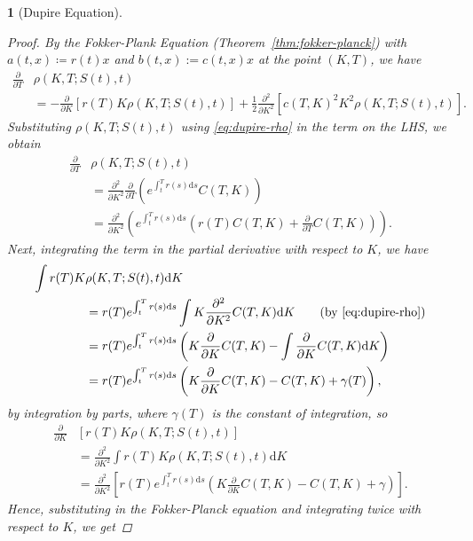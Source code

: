 \documentclass[english]{article}
\numberwithin{equation}{section}
\numberwithin{figure}{section}
\theoremstyle{bolddescit}
\newtheorem{theorem}{\protect\theoremname}[section]
\theoremstyle{definition}
\theoremstyle{definition}
\theoremstyle{plain}
\theoremstyle{plain}
\theoremstyle{bolddesc}
\theoremstyle{plain}
\theoremstyle{remark}
\providecommand{\theoremname}{Theorem}
\begin{document}
\begin{theorem}[Dupire Equation]
\begin{proof}
    By the Fokker-Plank Equation (Theorem~\ref{thm:fokker-planck}) with $a(t,x) \coloneqq r(t) x$ and $b(t,x) := c(t,x) x$ at the point $(K,T)$, we have
    \begin{align*}
      \frac{\partial}{\partial T}&\rho(K,T;S(t),t)\\
      &= - \frac{\partial}{\partial K}[r(T) K \rho(K,T;S(t),t)]
        + \frac{1}{2} \frac{\partial^2}{\partial K^2}[c(T,K)^2 K^2 \rho(K,T;S(t),t)].
    \end{align*}
    Substituting $\rho(K,T;S(t),t)$ using \eqref{eq:dupire-rho} in the term on the LHS, we obtain
    \begin{align*}
      \frac{\partial}{\partial T}&\rho(K,T;S(t),t)\\
      &= \frac{\partial^2}{\partial K^2} \frac{\partial}{\partial T}\left(e^{\int_t^T r(s) \mathrm{d}s} C(T,K)\right) \tag{by Schwarz's Theorem since $\rho \in C^2$}\\
      &= \frac{\partial^2}{\partial K^2} \left(e^{\int_t^T r(s) \mathrm{d}s} \left(r(T) C(T,K) + \frac{\partial}{\partial T}C(T,K)\right)\right).
    \end{align*}
    Next, integrating the term in the partial derivative with respect to $K$, we have
    \begin{align*}
      \int r(T) K &\rho(K,T;S(t),t) \mathrm{d}K\\
      &= r(T) e^{\int_t^T r(s) \mathrm{d}s} \int K \frac{\partial^2}{\partial K^2} C(T,K) \mathrm{d}K \tag{by \eqref{eq:dupire-rho}}\\
      &= r(T) e^{\int_t^T r(s) \mathrm{d}s} \left( K \frac{\partial}{\partial K} C(T,K) - \int \frac{\partial}{\partial K} C(T,K) \mathrm{d}K \right)\\
      &= r(T) e^{\int_t^T r(s) \mathrm{d}s} \left( K \frac{\partial}{\partial K} C(T,K) - C(T,K) + \gamma(T)\right),
    \end{align*}
    by integration by parts, where $\gamma(T)$ is the constant of integration, so
    \begin{align*}
      \frac{\partial}{\partial K} &[r(T) K \rho(K,T;S(t),t)]\\
      &= \frac{\partial^2}{\partial K^2} \int r(T) K \rho(K,T;S(t),t) \mathrm{d}K\\
      &= \frac{\partial^2}{\partial K^2} \left[r(T) e^{\int_t^T r(s) \mathrm{d}s} \left( K \frac{\partial}{\partial K} C(T,K) - C(T,K) + \gamma\right)\right].
    \end{align*}
    Hence, substituting in the Fokker-Planck equation and integrating twice with respect to $K$, we get

\end{proof}
\end{theorem}
\end{document}
